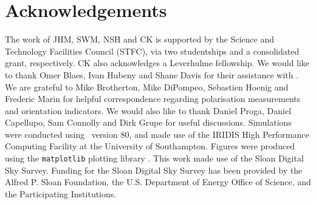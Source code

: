 \documentclass[useAMS,usenatbib]{mn2e_x}
\begin{document}
\section*{Acknowledgements}

The work of JHM, SWM, NSH and CK is supported by the
Science and Technology Facilities Council (STFC),
via two studentships and a consolidated grant, respectively.
CK also acknowledges a Leverhulme fellowship.
We would like to thank Omer Blaes, Ivan Hubeny and Shane Davis for their
assistance with \agn. We are grateful to Mike Brotherton, Mike DiPompeo,
Sebastien Hoenig and Frederic Marin for helpful correspondence regarding
polarisation measurements and orientation indicators.
We would also like to thank Daniel Proga, Daniel Capellupo, Sam Connolly and
Dirk Grupe for useful discussions.  Simulations were conducted using \py\ version 80,
and made use of the IRIDIS High Performance Computing Facility at the
University of Southampton. Figures were produced using the {\tt matplotlib} plotting library \citep{matplotlib}. This work made use of the Sloan Digital Sky Survey.
Funding for the Sloan Digital Sky Survey has been provided by
the Alfred P. Sloan Foundation, the U.S. Department of Energy Office of
Science, and the Participating Institutions.




\clearpage
\clearpage
\end{document}
